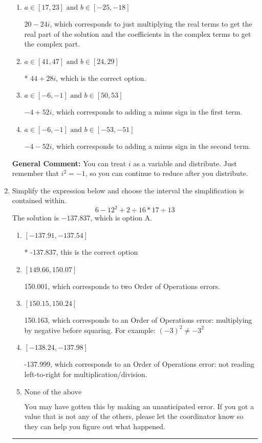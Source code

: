 \documentclass{extbook}[14pt]
\newcommand{\litem}[1]{\item #1

\rule{\textwidth}{0.4pt}}
\begin{document}
\begin{enumerate}
{\begin{enumerate}[label=\Alph*.]
 $44 - 28 i$, which corresponds to adding a minus sign in both terms.
\item \( a \in [17, 23] \text{ and } b \in [-25, -18] \)

 $20 - 24 i$, which corresponds to just multiplying the real terms to get the real part of the solution and the coefficients in the complex terms to get the complex part.
\item \( a \in [41, 47] \text{ and } b \in [24, 29] \)

* $44 + 28 i$, which is the correct option.
\item \( a \in [-6, -1] \text{ and } b \in [50, 53] \)

 $-4 + 52 i$, which corresponds to adding a minus sign in the first term.
\item \( a \in [-6, -1] \text{ and } b \in [-53, -51] \)

 $-4 - 52 i$, which corresponds to adding a minus sign in the second term.
\end{enumerate}

\textbf{General Comment:} You can treat $i$ as a variable and distribute. Just remember that $i^2=-1$, so you can continue to reduce after you distribute.
}
\litem{
Simplify the expression below and choose the interval the simplification is contained within.
\[ 6 - 12^2 + 2 \div 16 * 17 \div 13 \]The solution is \( -137.837 \), which is option A.\begin{enumerate}[label=\Alph*.]
\item \( [-137.91, -137.54] \)

* -137.837, this is the correct option
\item \( [149.66, 150.07] \)

 150.001, which corresponds to two Order of Operations errors.
\item \( [150.15, 150.24] \)

 150.163, which corresponds to an Order of Operations error: multiplying by negative before squaring. For example: $(-3)^2 \neq -3^2$
\item \( [-138.24, -137.98] \)

 -137.999, which corresponds to an Order of Operations error: not reading left-to-right for multiplication/division.
\item \( \text{None of the above} \)

 You may have gotten this by making an unanticipated error. If you got a value that is not any of the others, please let the coordinator know so they can help you figure out what happened.
\end{enumerate}

}
\end{enumerate}
\end{document}
